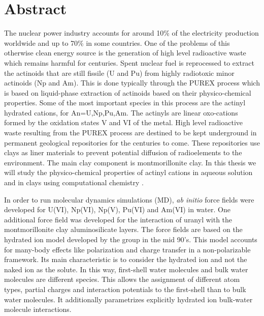 \chapter*{Abstract}
The nuclear power industry accounts for around 10\% of the electricity production worldwide and 
up to 70\% in some countries.\cite{NuclearElectricEnergy} One of the problems of this otherwise 
clean energy source is 
the generation of high level radioactive waste which remains harmful for 
centuries.\cite{NuclearesLozano} 
Spent nuclear fuel is reprocessed to extract the actinoids that are still fissile (U  and 
Pu) 
from highly radiotoxic minor actinoids (Np and 
Am).\cite{NuclearesLozano,HERBST2011141,Katz2007-ch24} This is done typically through the  
PUREX process which is based on liquid-phase extraction of actinoids based on their 
physico-chemical properties. Some of the most important species in this process are the actinyl 
hydrated cations, \ce{[AnO_2*(H2O)5]^{2+/+}(aq)]} for An=U,Np,Pu,Am. The actinyls are linear 
oxo-cations formed by the oxidation states V and VI of the metal. High level radioactive waste 
resulting from the PUREX process are destined to be kept underground in permanent geological 
repositories for the centuries to come.\cite{NuclearesLozano} These repositories use clays as liner 
materials to prevent 
potential diffusion of radioelements to the environment.\cite{Delage2010} The main clay component 
 is montmorillonite clay.\cite{Delage2010} In this thesis we will study the physico-chemical 
properties of actinyl cations in aqueous solution and in clays using computational chemistry . 

In order to run molecular dynamics simulations (MD), \textit{ab initio} force fields were developed 
for 
U(VI), Np(VI), Np(V), Pu(VI) and Am(VI) in water. One additional force field was developed for the 
interaction 
of uranyl with the montmorillonite clay aluminosilicate layers. The force fields 
are based on the hydrated ion model\cite{JPhysChem_ESM_1993,JChemPhys_ESM_1998,JACS_ESM_1999} 
developed by the group in the mid 90's. This model accounts 
for many-body effects like polarization and charge transfer in a non-polarizable framework. Its 
main characteristic is to consider the hydrated ion and not the naked ion as the solute. In this 
way, 
first-shell water molecules and bulk water molecules are different species. This allows 
the assignment of different atom types, partial charges and interaction potentials to the 
first-shell than to 
bulk water molecules. It additionally parametrizes explicitly hydrated ion bulk-water 
molecule interactions. 

